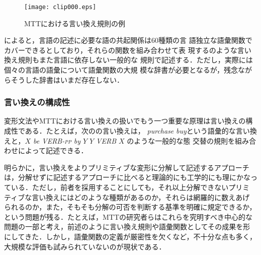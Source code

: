 \begin{figure}[t]
\begin{center}
\leavevmode
\texttt{[image: clip000.eps]}
\caption{MTTにおける言い換え規則の例\cite{iordanskaja:96}}
\label{fig:MTTrule}
\end{center}
\end{figure}



によると，言語の記述に必要な語の共起関係は60種類の言
語独立な語彙関数でカバーできるとしており，それらの関数を組み合わせて表
現するのような言い換え規則もまた言語に依存しない一般的な
規則で記述する．ただし，実際には個々の言語の語彙について語彙関数の大規
模な辞書が必要となるが，残念ながらそうした辞書はいまだ存在しない．

\subsubsection{言い換えの構成性}

変形文法やMTTにおける言い換えの扱いでもう一つ重要な原理は言い換えの構
成性である．たとえば，次のの言い換えは，
\emph{purchase} {\ra} \emph{buy}という語彙的な言い換えと，\emph{$X$ be
VERB-\textsc{pp} by $Y$} {\ra} \emph{$Y$ VERB $X$} のような一般的な態
交替の規則を組み合わせによって記述できる．

明らかに，言い換えをよりプリミティブな変形に分解して記述するアプローチ
は，分解せずに記述するアプローチに比べると理論的にも工学的にも理にかなっ
ている．ただし，前者を採用することにしても，それ以上分解できないプリミ
ティブな言い換えにはどのような種類があるのか，それらは網羅的に数えあげ
られるのか，また，そもそも分解の可否を判断する基準を明確に規定できるか，
という問題が残る．たとえば，MTTの研究者らはこれらを究明すべき中心的な
問題の一部と考え，前述のように言い換え規則や語彙関数としてその成果を形
にしてきた．しかし，語彙関数の定義が厳密性を欠くなど，不十分な点も多く，
大規模な評価も試みられていないのが現状である．

